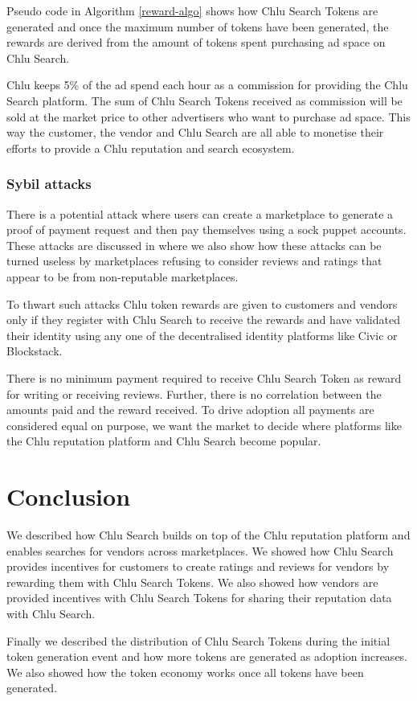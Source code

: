 \documentclass[a4paper]{article}
\begin{document}
Pseudo code in Algorithm \ref{reward-algo} shows how Chlu Search Tokens
are generated and once the maximum number of tokens have been
generated, the rewards are derived from the amount of tokens spent
purchasing ad space on Chlu Search.

Chlu keeps 5\% of the ad spend each hour as a commission for providing
the Chlu Search platform. The sum of Chlu Search Tokens received as
commission will be sold at the market price to other advertisers who
want to purchase ad space. This way the customer, the vendor and Chlu
Search are all able to monetise their efforts to provide a Chlu
reputation and search ecosystem.

\subsubsection{Sybil attacks}

There is a potential attack where users can create a marketplace to
generate a proof of payment request and then pay themselves using a
sock puppet accounts. These attacks are discussed in
\cite{chlu-reputation} where we also show how these attacks can be
turned useless by marketplaces refusing to consider reviews and
ratings that appear to be from non-reputable marketplaces.

To thwart such attacks Chlu token rewards are given to customers and
vendors only if they register with Chlu Search to receive the rewards
and have validated their identity using any one of the decentralised
identity platforms like Civic\cite{civic} or
Blockstack\cite{blockstack}.

There is no minimum payment required to receive Chlu Search Token as
reward for writing or receiving reviews. Further, there is no
correlation between the amounts paid and the reward received. To drive
adoption all payments are considered equal on purpose, we want the
market to decide where platforms like the Chlu reputation platform and
Chlu Search become popular.

\section{Conclusion}

We described how Chlu Search builds on top of the Chlu reputation
platform and enables searches for vendors across marketplaces. We
showed how Chlu Search provides incentives for customers to create
ratings and reviews for vendors by rewarding them with Chlu Search
Tokens. We also showed how vendors are provided incentives with Chlu
Search Tokens for sharing their reputation data with Chlu Search.

Finally we described the distribution of Chlu Search Tokens during the
initial token generation event and how more tokens are generated as
adoption increases. We also showed how the token economy works once
all tokens have been generated.

\medskip
 


\end{document}
